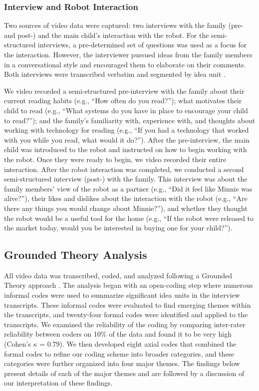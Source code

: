 \documentclass{sigchi}
\begin{document}
\subsubsection{Interview and Robot Interaction}
Two sources of video data were captured: two interviews with the family (pre- and post-) and the main child's interaction with the robot. For the semi-structured interviews, a pre-determined set of questions was used as a focus for the interaction. However, the interviewer pursued ideas from the family members in a conversational style and encouraged them to elaborate on their comments. Both interviews were transcribed verbatim and segmented by idea unit \cite{Chi:1997}.
 
We video recorded a semi-structured pre-interview with the family about their current reading habits (e.g., ``How often do you read?''); what motivates their child to read (e.g., ``What systems do you have in place to encourage your child to read?''); and the family's familiarity with, experience with, and thoughts about working with technology for reading (e.g., ``If you had a technology that worked with you while you read, what would it do?''). After the pre-interview, the main child was introduced to the robot and instructed on how to begin working with the robot. Once they were ready to begin, we video recorded their entire interaction. After the robot interaction was completed, we conducted a second semi-structured interview (post-) with the family. This interview was about the family members' view of the robot as a partner (e.g., ``Did it feel like Minnie was alive?''), their likes and dislikes about the interaction with the robot (e.g., ``Are there any things you would change about Minnie?''), and whether they thought the robot would be a useful tool for the home (e.g., ``If the robot were released to the market today, would you be interested in buying one for your child?'').

\subsection{Grounded Theory Analysis}
All video data was transcribed, coded, and analyzed following a Grounded Theory approach \cite{Glaser:1967,Charmaz:2012}. The analysis began with an open-coding step where numerous informal codes were used to summarize significant idea units in the interview transcripts. These informal codes were evaluated to find emerging themes within the transcripts, and twenty-four formal codes were identified and applied to the transcripts. We examined the reliability of the coding by comparing inter-rater reliability between coders on 10\% of the data and found it to be very high (Cohen's $\kappa$ = 0.79). We then developed eight axial codes that combined the formal codes to refine our coding scheme into broader categories, and these categories were further organized into four major themes. The findings below present details of each of the major themes and are followed by a discussion of our interpretation of these findings.
\end{document}

